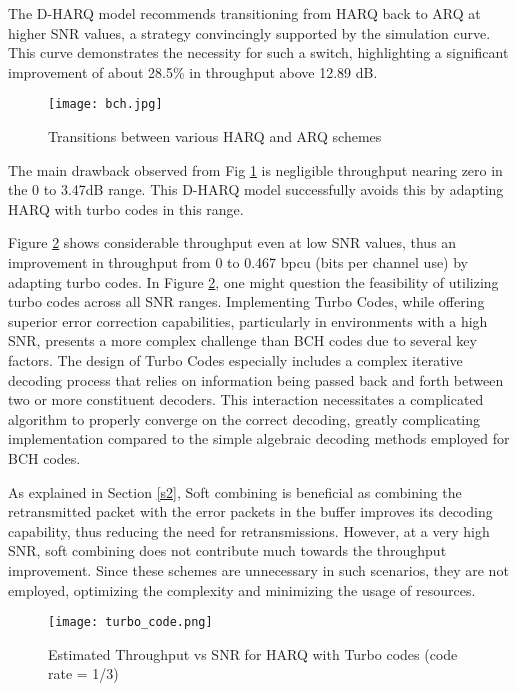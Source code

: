 \documentclass[sn-mathphys-num]{sn-jnl}
\theoremstyle{thmstyleone}
\theoremstyle{thmstyletwo}%
\theoremstyle{thmstylethree}%
\begin{document}
The D-HARQ model recommends transitioning from HARQ back to ARQ at higher SNR values, a strategy convincingly supported by the simulation curve. This curve demonstrates the necessity for such a switch, highlighting a significant improvement of about 28.5\% in throughput above 12.89 dB.

\begin{figure}[H]
    \centering
    \texttt{[image: bch.jpg]}
    \caption{Transitions between various HARQ and ARQ schemes}
    \label{fig:7}
\end{figure}

The main drawback observed from Fig \ref{fig:7} is negligible throughput nearing zero in the 0 to 3.47dB range. This D-HARQ model successfully avoids this by adapting HARQ with turbo codes in this range.

Figure \ref{fig:6} shows considerable throughput even at low SNR values, thus an improvement in throughput from 0 to 0.467 bpcu (bits per channel use) by adapting turbo codes. In Figure \ref{fig:6}, one might question the feasibility of utilizing turbo codes across all SNR ranges. Implementing Turbo Codes, while offering superior error correction capabilities, particularly in environments with a high SNR, presents a more complex challenge than BCH codes due to several key factors. The design of Turbo Codes especially includes a complex iterative decoding process that relies on information being passed back and forth between two or more constituent decoders. This interaction necessitates a complicated algorithm to properly converge on the correct decoding, greatly complicating implementation compared to the simple algebraic decoding methods employed for BCH codes.

As explained in Section \ref{s2}, Soft combining is beneficial as combining the retransmitted packet with the error packets in the buffer improves its decoding capability, thus reducing the need for retransmissions. However, at a very high SNR, soft combining does not contribute much towards the throughput improvement. Since these schemes are unnecessary in such scenarios, they are not employed, optimizing the complexity and minimizing the usage of resources.

\begin{figure}[H]     
    \centering     
    \texttt{[image: turbo\_code.png]}     
    \caption{Estimated Throughput vs SNR for HARQ with Turbo codes (code rate = 1/3)}     
    \label{fig:6} 
\end{figure}
\end{document}
